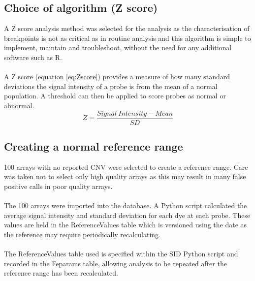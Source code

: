 \subsection{Choice of algorithm (Z score)}
A Z score analysis method was selected for the analysis as the characterisation of breakpoints is not as critical as in routine analysis and this algorithm is simple to implement, maintain and troubleshoot, without the need for any additional software such as R.
\paragraph*{}
A Z score (equation \ref{eq:Zscore}) provides a measure of how many standard deviations the signal intensity of a probe is from the mean of a normal population. A threshold can then be applied to score probes as normal or abnormal.
\begin{equation} \label{eq:Zscore}
Z = \frac{Signal\ Intensity - Mean}{SD}
\end{equation}

\subsection{Creating a normal reference range} \label{ch:createreference}
100 arrays with no reported CNV were selected to create a reference range. Care was taken not to select only high quality arrays as this may result in many false positive calls in poor quality arrays.
\paragraph*{}
The 100 arrays were imported into the database. A Python script calculated the average signal intensity and standard deviation for each dye at each probe.
These values are held in the ReferenceValues table which is versioned using the date as the reference may require periodically recalculating.
\paragraph*{}
The ReferenceValues table used is specified within the SID  Python script and recorded in the Feparams table, allowing analysis to be repeated after the reference range has been recalculated.

